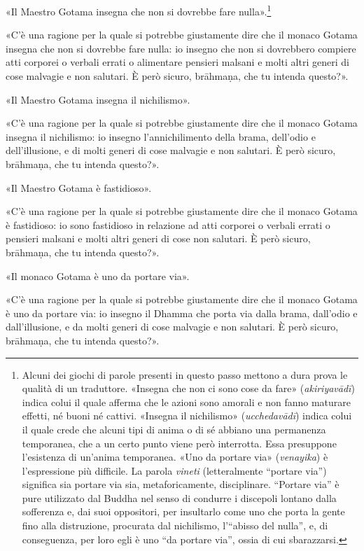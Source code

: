 «Il Maestro Gotama insegna che non si dovrebbe fare
nulla».\footnote{Alcuni dei giochi di parole presenti in questo passo mettono a dura prova le qualità di un traduttore. «Insegna che non ci sono cose da fare» (\emph{akiriyavādī}) indica colui il quale afferma che le azioni sono amorali e non fanno maturare effetti, né buoni né cattivi. «Insegna il nichilismo» (\emph{ucchedavādī}) indica colui il quale crede che alcuni tipi di anima o di sé abbiano una permanenza temporanea, che a un certo punto viene però interrotta. Essa presuppone l’esistenza di un’anima temporanea. «Uno da portare via» (\emph{venayika}) è l’espressione più difficile. La parola \emph{vineti} (letteralmente “portare via”) significa sia portare via sia, metaforicamente, disciplinare. “Portare via” è pure utilizzato dal Buddha nel senso di condurre i discepoli lontano dalla sofferenza e, dai suoi oppositori, per insultarlo come uno che porta la gente fino alla distruzione, procurata dal nichilismo, l’“abisso del nulla”, e, di conseguenza, per loro egli è uno “da portare via”, ossia di cui sbarazzarsi.}


«C’è una ragione per la quale si potrebbe giustamente dire che il monaco
Gotama insegna che non si dovrebbe fare nulla: io insegno che non si
dovrebbero compiere atti corporei o verbali errati o alimentare pensieri
malsani e molti altri generi di cose malvagie e non salutari. È però
sicuro, brāhmaṇa, che tu intenda questo?».


«Il Maestro Gotama insegna il nichilismo».


«C’è una ragione per la quale si potrebbe giustamente dire che il monaco
Gotama insegna il nichilismo: io insegno l’annichilimento della brama,
dell’odio e dell’illusione, e di molti generi di cose malvagie e non
salutari. È però sicuro, brāhmaṇa, che tu intenda questo?».


«Il Maestro Gotama è fastidioso».


«C’è una ragione per la quale si potrebbe giustamente dire che il monaco
Gotama è fastidioso: io sono fastidioso in relazione ad atti corporei o
verbali errati o pensieri malsani e molti altri generi di cose non
salutari. È però sicuro, brāhmaṇa, che tu intenda questo?».


«Il monaco Gotama è uno da portare via».


«C’è una ragione per la quale si potrebbe giustamente dire che il monaco
Gotama è uno da portare via: io insegno il Dhamma che porta via dalla
brama, dall’odio e dall’illusione, e da molti generi di cose malvagie e
non salutari. È però sicuro, brāhmaṇa, che tu intenda questo?».


